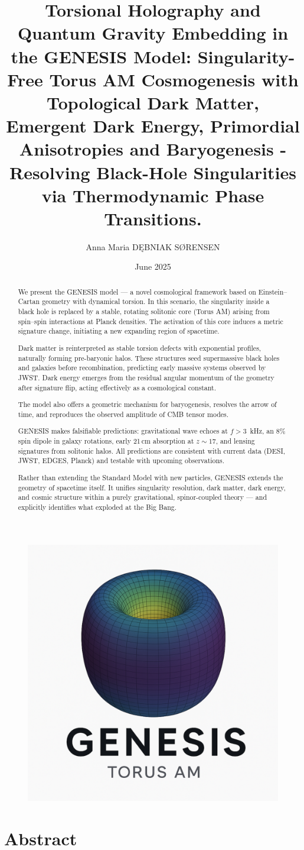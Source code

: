 \documentclass{article}
\title{Torsional Holography and Quantum Gravity Embedding in the GENESIS Model: Singularity-Free Torus AM Cosmogenesis with Topological Dark Matter, Emergent Dark Energy, Primordial Anisotropies and Baryogenesis - Resolving Black-Hole Singularities via Thermodynamic Phase Transitions.}
\author{Anna Maria DĘBNIAK SØRENSEN}
\date{June 2025}
\begin{document}
\begin{figure}
    \centering
    \includegraphics[width=0.5\linewidth]{TorusAM.png}
\end{figure}



\maketitle
\clearpage

\section{Abstract}



    
\begin{abstract}
We present the GENESIS model — a novel cosmological framework based on Einstein–Cartan geometry with dynamical torsion. In this scenario, the singularity inside a black hole is replaced by a stable, rotating solitonic core (Torus AM) arising from spin–spin interactions at Planck densities. The activation of this core induces a metric signature change, initiating a new expanding region of spacetime.

Dark matter is reinterpreted as stable torsion defects with exponential profiles, naturally forming pre-baryonic halos. These structures seed supermassive black holes and galaxies before recombination, predicting early massive systems observed by JWST. Dark energy emerges from the residual angular momentum of the geometry after signature flip, acting effectively as a cosmological constant.

The model also offers a geometric mechanism for baryogenesis, resolves the arrow of time, and reproduces the observed amplitude of CMB tensor modes.

GENESIS makes falsifiable predictions: gravitational wave echoes at $f > 3$~kHz, an 8\% spin dipole in galaxy rotations, early 21\,cm absorption at $z \sim 17$, and lensing signatures from solitonic halos. All predictions are consistent with current data (DESI, JWST, EDGES, Planck) and testable with upcoming observations.

Rather than extending the Standard Model with new particles, GENESIS extends the geometry of spacetime itself. It unifies singularity resolution, dark matter, dark energy, and cosmic structure within a purely gravitational, spinor-coupled theory — and explicitly identifies what exploded at the Big Bang.
\end{abstract}
\end{document}
